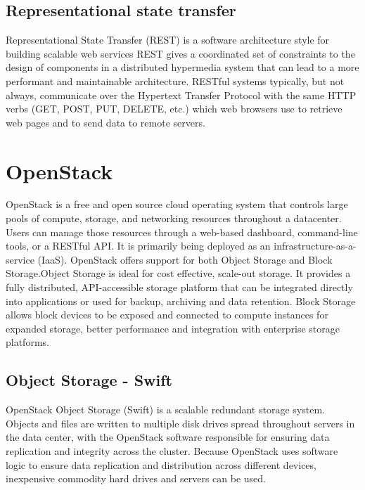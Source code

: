   \subsection{Representational state transfer}
    Representational State Transfer (REST) is a software architecture style for building scalable web services\cite{fielding-taylor-2000} REST gives a coordinated set of constraints to the design of components in a distributed hypermedia system that can lead to a more performant and maintainable architecture\cite{fielding-2000}.
    RESTful systems typically, but not always, communicate over the Hypertext Transfer Protocol with the same HTTP verbs (GET, POST, PUT, DELETE, etc.) which web browsers use to retrieve web pages and to send data to remote servers.


\section{OpenStack}
  OpenStack\cite{openstack} is a free and open source cloud operating system that controls large pools of compute, storage, and networking resources throughout a datacenter. Users can manage those resources through a web-based dashboard, command-line tools, or a RESTful API. It is primarily being deployed as an infrastructure-as-a-service (IaaS). OpenStack offers support for both Object Storage and Block Storage.Object Storage is ideal for cost effective, scale-out storage. It provides a fully distributed, API-accessible storage platform that can be integrated directly into applications or used for backup, archiving and data retention. Block Storage allows block devices to be exposed and connected to compute instances for expanded storage, better performance and integration with enterprise storage platforms.

  \subsection{Object Storage - Swift}
    OpenStack Object Storage (Swift) is a scalable redundant storage system. Objects and files are written to multiple disk drives spread throughout servers in the data center, with the OpenStack software responsible for ensuring data replication and integrity across the cluster. Because OpenStack uses software logic to ensure data replication and distribution across different devices, inexpensive commodity hard drives and servers can be used.


